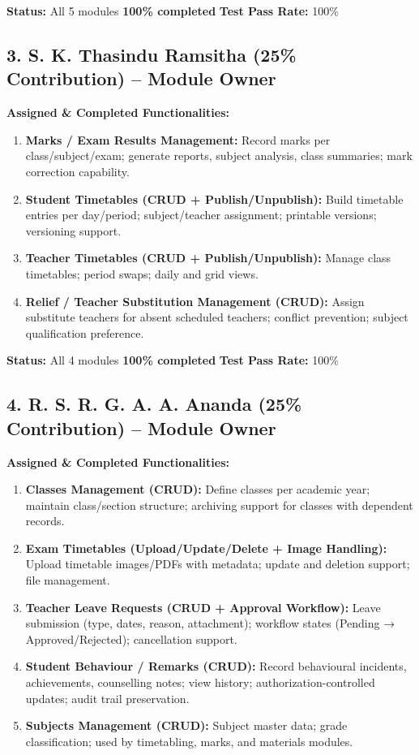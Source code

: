 \documentclass[11pt, a4paper]{article}
\begin{document}
\textbf{Status:} All 5 modules \textbf{100\% completed} \quad \textbf{Test Pass Rate:} 100\%

\vspace{0.3cm}

\subsection*{3. S. K. Thasindu Ramsitha (25\% Contribution) -- Module Owner}

\textbf{Assigned \& Completed Functionalities:}
\begin{enumerate}[itemsep=1pt, topsep=2pt, leftmargin=15pt]
    \item \textbf{Marks / Exam Results Management:} Record marks per class/subject/exam; generate reports, subject analysis, class summaries; mark correction capability.
    \item \textbf{Student Timetables (CRUD + Publish/Unpublish):} Build timetable entries per day/period; subject/teacher assignment; printable versions; versioning support.
    \item \textbf{Teacher Timetables (CRUD + Publish/Unpublish):} Manage class timetables; period swaps; daily and grid views.
    \item \textbf{Relief / Teacher Substitution Management (CRUD):} Assign substitute teachers for absent scheduled teachers; conflict prevention; subject qualification preference.
\end{enumerate}

\textbf{Status:} All 4 modules \textbf{100\% completed} \quad \textbf{Test Pass Rate:} 100\%

\vspace{0.3cm}

\subsection*{4. R. S. R. G. A. A. Ananda (25\% Contribution) -- Module Owner}

\textbf{Assigned \& Completed Functionalities:}
\begin{enumerate}[itemsep=1pt, topsep=2pt, leftmargin=15pt]
    \item \textbf{Classes Management (CRUD):} Define classes per academic year; maintain class/section structure; archiving support for classes with dependent records.
    \item \textbf{Exam Timetables (Upload/Update/Delete + Image Handling):} Upload timetable images/PDFs with metadata; update and deletion support; file management.
    \item \textbf{Teacher Leave Requests (CRUD + Approval Workflow):} Leave submission (type, dates, reason, attachment); workflow states (Pending → Approved/Rejected); cancellation support.
    \item \textbf{Student Behaviour / Remarks (CRUD):} Record behavioural incidents, achievements, counselling notes; view history; authorization-controlled updates; audit trail preservation.
    \item \textbf{Subjects Management (CRUD):} Subject master data; grade classification; used by timetabling, marks, and materials modules.
\end{enumerate}
\end{document}
